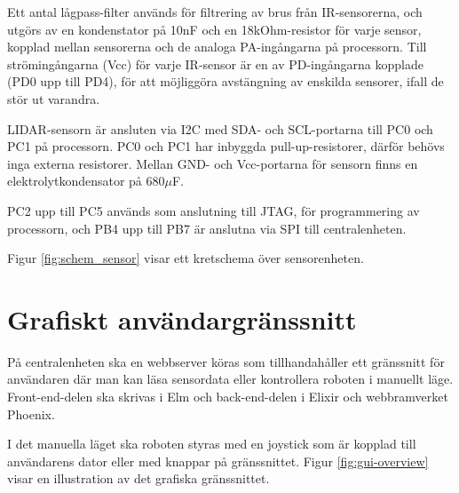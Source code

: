 \documentclass[a4paper,titlepage,12pt]{article}
\begin{document}
    Ett antal lågpass-filter används för filtrering av brus från IR-sensorerna,
    och utgörs av en kondenstator på 10nF och en 18kOhm-resistor för varje
    sensor, kopplad mellan sensorerna och de analoga PA-ingångarna på
    processorn. Till strömingångarna (Vcc) för varje IR-sensor är en av
    PD-ingångarna kopplade (PD0 upp till PD4), för att möjliggöra avstängning
    av enskilda sensorer, ifall de stör ut varandra.

    LIDAR-sensorn är ansluten via I2C med SDA- och SCL-portarna till PC0 och
    PC1 på processorn. PC0 och PC1 har inbyggda pull-up-resistorer, därför
    behövs inga externa resistorer. Mellan GND- och Vcc-portarna för sensorn
    finns en elektrolytkondensator på 680$\mu$F.

    PC2 upp till PC5 används som anslutning till JTAG, för programmering av
    processorn, och PB4 upp till PB7 är anslutna via SPI till centralenheten.

    Figur \ref{fig:schem_sensor} visar ett kretschema över sensorenheten.

	

    \newpage
	\section{Grafiskt användargränssnitt}
	På centralenheten ska en webbserver köras som tillhandahåller ett gränssnitt
	för användaren där man kan läsa sensordata eller kontrollera roboten i
	manuellt läge. Front-end-delen ska skrivas i Elm och back-end-delen i Elixir
    och webbramverket Phoenix.

	I det manuella läget ska roboten styras med en joystick som är kopplad till användarens
    dator eller med knappar på gränssnittet. Figur \ref{fig:gui-overview} visar en illustration av
    det grafiska gränssnittet.
	
\end{document}
